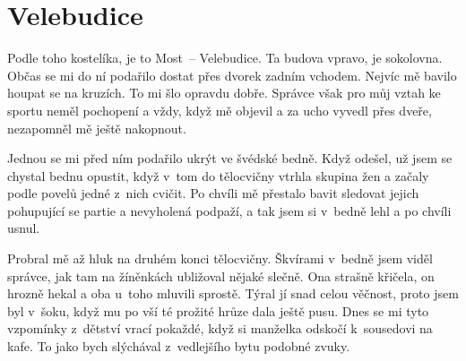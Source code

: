 
\chapter{Velebudice}

Podle toho kostelíka, je to Most~-- Velebudice. Ta budova vpravo, je sokolovna.
Občas se mi do ní podařilo dostat přes dvorek zadním vchodem. Nejvíc mě bavilo
houpat se na kruzích. To mi šlo opravdu dobře. Správce však pro můj vztah ke
sportu neměl pochopení a vždy, když mě objevil a za ucho vyvedl přes dveře,
nezapomněl mě ještě nakopnout.

Jednou se mi před ním podařilo ukrýt ve švédské bedně. Když odešel, už jsem se
chystal bednu opustit, když v~tom do tělocvičny vtrhla skupina žen a začaly
podle povelů jedné z~nich cvičit. Po chvíli mě přestalo bavit sledovat jejich
pohupující se partie a nevyholená podpaží, a tak jsem si v~bedně lehl a po
chvíli usnul.

Probral mě až hluk na druhém konci tělocvičny. Škvírami v~bedně jsem viděl
správce, jak tam na žíněnkách ubližoval nějaké slečně. Ona strašně křičela, on
hrozně hekal a oba u~toho mluvili sprostě. Týral jí snad celou věčnost, proto
jsem byl v~šoku, když mu po vší té prožité hrůze dala ještě pusu. Dnes se mi
tyto vzpomínky z~dětství vrací pokaždé, když si manželka odskočí k~sousedovi na
kafe. To jako bych slýchával z~vedlejšího bytu podobné zvuky.

